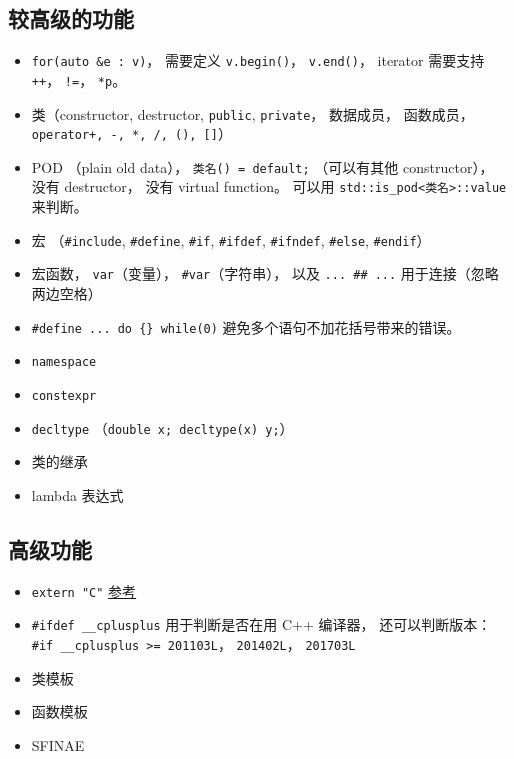\subsection{较高级的功能}
\begin{itemize}
\item \verb|for(auto &e : v)|， 需要定义 \verb|v.begin()|， \verb|v.end()|， iterator 需要支持 \verb|++|， \verb|!=|， \verb|*p|。
\item 类（constructor, destructor, \verb|public|, \verb|private|， 数据成员， 函数成员， \verb|operator+, -, *, /, (), []|）
\item POD （plain old data）， \verb|类名() = default;| （可以有其他 constructor）， 没有 destructor， 没有 virtual function。 可以用 \verb|std::is_pod<类名>::value| 来判断。
\item 宏 （\verb|#include|, \verb|#define|, \verb|#if|, \verb|#ifdef|, \verb|#ifndef|, \verb|#else|, \verb|#endif|）
\item 宏函数， \verb|var|（变量）， \verb|#var|（字符串）， 以及 \verb|... ## ...| 用于连接（忽略两边空格）
\item \verb|#define ... do {} while(0)| 避免多个语句不加花括号带来的错误。
\item \verb|namespace|
\item \verb|constexpr|
\item \verb|decltype| （\verb|double x; decltype(x) y;|）
\item 类的继承
\item lambda 表达式
\end{itemize}

\subsection{高级功能}
\begin{itemize}
\item \verb|extern "C"| \href{https://www.geeksforgeeks.org/extern-c-in-c/}{参考}
\item \verb|#ifdef __cplusplus| 用于判断是否在用 C++ 编译器， 还可以判断版本： \verb|#if __cplusplus >= 201103L|， \verb|201402L|， \verb|201703L|
\item 类模板
\item 函数模板
\item SFINAE
\end{itemize}
